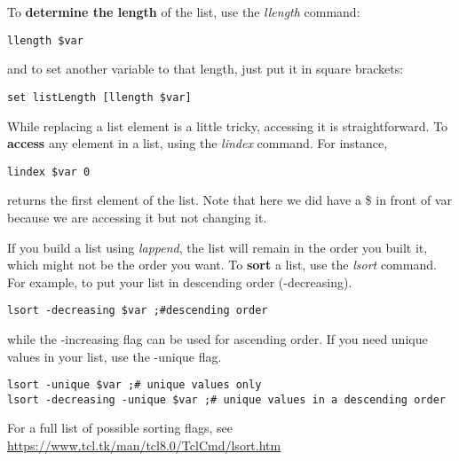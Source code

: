 \documentclass[letter,11pt]{article}
\begin{document}
To {\bf determine the length} of the list, use the {\it llength} command:
\begin{lstlisting}
llength $var
\end{lstlisting}
and to set another variable to that length, just put it in square brackets: 
\begin{lstlisting}
set listLength [llength $var]
\end{lstlisting}

While replacing a list  element is a little tricky, accessing it is straightforward. To {\bf access} any element in a list, using the {\it lindex} command.   For instance, 
\begin{lstlisting}
lindex $var 0
\end{lstlisting}
returns the first element of the list.  Note that here we did have a \$ in front of var because we are accessing it but not changing it. 



If you build a list using {\it lappend}, the list will remain in the order you built it, which might not be the order you want.  To {\bf sort} a list, use the {\it lsort} command. For example, to put your list in descending order (-decreasing). 
\begin{lstlisting}
lsort -decreasing $var ;#descending order
\end{lstlisting}
while the -increasing flag can be used for ascending order.  If you need unique values in your list, use the -unique flag. 

\begin{lstlisting}
lsort -unique $var ;# unique values only
lsort -decreasing -unique $var ;# unique values in a descending order
\end{lstlisting}

For a full list of possible sorting flags,  see \url{https://www.tcl.tk/man/tcl8.0/TclCmd/lsort.htm}
\end{document}
